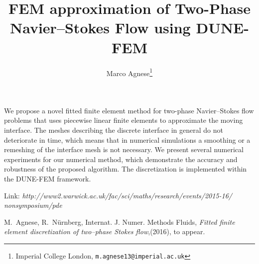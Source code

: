 \documentclass{article}
\begin{document}
\title{FEM approximation of Two-Phase Navier--Stokes Flow using DUNE-FEM}
\author{%
  Marco Agnese\thanks{Imperial College London,
    \texttt{m.agnese13@imperial.ac.uk}}
}
\maketitle

We propose a novel fitted finite element method for two-phase Navier--Stokes
flow problems that uses piecewise linear finite elements to approximate the
moving interface. The meshes describing the discrete interface in general do
not deteriorate in time, which means that in numerical simulations a smoothing
or a remeshing of the interface mesh is not necessary. We present several
numerical experiments for our numerical method, which demonstrate the accuracy
and robustness of the proposed algorithm. The discretization is implemented
within the DUNE-FEM framework.

Link: \emph{http://www2.warwick.ac.uk/fac/sci/maths/research/events/2015-16/
nonsymposium/pde}

\begin{thebibliography}{10}

M.~Agnese, R.~N\"urnberg, Internat. J. Numer. Methods Fluids,
\emph{ Fitted finite element discretization of two--phase Stokes flow},(2016),
to appear.
\end{thebibliography}
\end{document}
